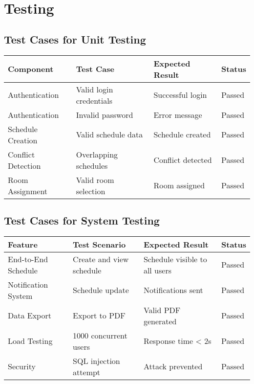 \documentclass[12pt,a4paper]{report}
\begin{document}
\chapter{Testing}
\section{Test Cases for Unit Testing}
\begin{longtable}{|p{3cm}|p{4cm}|p{4cm}|p{4cm}|}
\hline
\textbf{Component} & \textbf{Test Case} & \textbf{Expected Result} & \textbf{Status} \\
\hline
Authentication & Valid login credentials & Successful login & Passed \\
\hline
Authentication & Invalid password & Error message & Passed \\
\hline
Schedule Creation & Valid schedule data & Schedule created & Passed \\
\hline
Conflict Detection & Overlapping schedules & Conflict detected & Passed \\
\hline
Room Assignment & Valid room selection & Room assigned & Passed \\
\hline
\end{longtable}

\section{Test Cases for System Testing}
\begin{longtable}{|p{3cm}|p{4cm}|p{4cm}|p{4cm}|}
\hline
\textbf{Feature} & \textbf{Test Scenario} & \textbf{Expected Result} & \textbf{Status} \\
\hline
End-to-End Schedule & Create and view schedule & Schedule visible to all users & Passed \\
\hline
Notification System & Schedule update & Notifications sent & Passed \\
\hline
Data Export & Export to PDF & Valid PDF generated & Passed \\
\hline
Load Testing & 1000 concurrent users & Response time < 2s & Passed \\
\hline
Security & SQL injection attempt & Attack prevented & Passed \\
\hline
\end{longtable}
\end{document}
